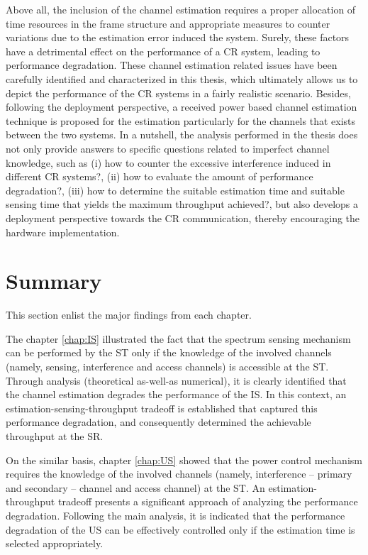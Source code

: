 Above all, the inclusion of the channel estimation requires a proper allocation of time resources in the frame structure and appropriate measures to counter variations due to the estimation error induced the system. Surely, these factors have a detrimental effect on the performance of a CR system, leading to performance degradation. These channel estimation related issues have been carefully identified and characterized in this thesis, which ultimately allows us to depict the performance of the CR systems in a fairly realistic scenario. Besides, following the deployment perspective, a received power based channel estimation technique is proposed for the estimation particularly for the channels that exists between the two systems. In a nutshell, the analysis performed in the thesis does not only provide answers to specific questions related to imperfect channel knowledge, such as (i) how to counter the excessive interference induced in different CR systems?, (ii) how to evaluate the amount of performance degradation?, (iii) how to determine the suitable estimation time and suitable sensing time that yields the maximum throughput achieved?, but also develops a deployment perspective towards the CR communication, thereby encouraging the hardware implementation. 


\section{Summary}
This section enlist the major findings from each chapter. 

The chapter \ref{chap:IS} illustrated the fact that the spectrum sensing mechanism can be performed by the ST only if the knowledge of the involved channels (namely, sensing, interference and access channels) is accessible at the ST. Through analysis (theoretical as-well-as numerical), it is clearly identified that the channel estimation degrades the performance of the IS. In this context, an estimation-sensing-throughput tradeoff is established that captured this performance degradation, and consequently determined the achievable throughput at the SR.

On the similar basis, chapter \ref{chap:US} showed that the power control mechanism requires the knowledge of the involved channels (namely, interference -- primary and secondary -- channel and access channel) at the ST. An estimation-throughput tradeoff presents a significant approach of analyzing the performance degradation. Following the main analysis, it is indicated that the performance degradation of the US can be effectively controlled only if the estimation time is selected appropriately.   

